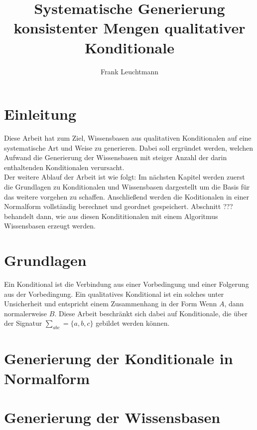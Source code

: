 \documentclass[12pt,a4paper]{article}
\author{Frank Leuchtmann}
\title{Systematische Generierung konsistenter Mengen qualitativer
Konditionale}
\begin{document}
\maketitle
\newpage
\tableofcontents
\newpage
\section{Einleitung}
Diese Arbeit hat zum Ziel, Wissensbasen aus qualitativen Konditionalen auf eine systematische Art und Weise zu generieren. Dabei soll ergründet werden, welchen Aufwand die Generierung der Wissensbasen mit steiger Anzahl der darin  enthaltenden Konditionalen verursacht.
\\
Der weitere Ablauf der Arbeit ist wie folgt: Im nächsten Kapitel werden zuerst die Grundlagen zu Konditionalen und Wissensbasen dargestellt um die Basis für das weitere vorgehen zu schaffen. Anschließend werden die Koditionalen in einer Normalform vollständig berechnet und geordnet gespeichert. Abschnitt ??? behandelt dann, wie aus diesen Kondititionalen mit einem Algoritmus Wissensbasen erzeugt werden.
\section{Grundlagen}
Ein Konditional ist die Verbindung aus einer Vorbedingung und einer Folgerung aus der Vorbedingung. Ein qualitatives Konditional ist ein solches unter  Unsicherheit und entspricht einem Zusammenhang in der Form \grqq Wenn $A$, dann normalerweise $B$\grqq .
Diese Arbeit beschränkt sich dabei auf Konditionale, die über der Signatur $\sum_{abc} = \{a, b, c\}$ gebildet werden können.
\cite{beierle17}
\section{Generierung der Konditionale in Normalform}
\section{Generierung der Wissensbasen}
\newpage

 
\end{document}
